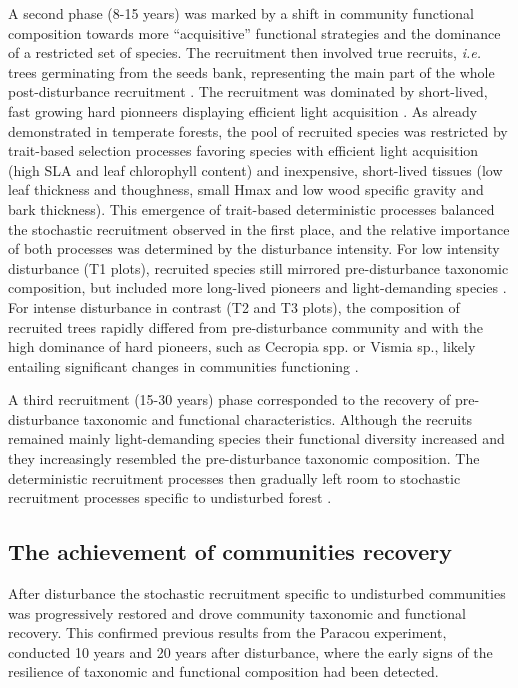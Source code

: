 \documentclass[fleqn,10pt]{ArtEcoFoG} %
\begin{document}
A second phase (8-15 years) was marked by a shift in community
functional composition towards more ``acquisitive'' functional
strategies and the dominance of a restricted set of species. The
recruitment then involved true recruits, \emph{i.e.} trees germinating
from the seeds bank, representing the main part of the whole
post-disturbance recruitment \citep{Lawton1988}. The recruitment was
dominated by short-lived, fast growing hard pionneers displaying efficient light acquisition
\citep{Wright2004, Chave2009b, Herault2011}. As already demonstrated in
temperate forests, the pool of recruited species was restricted by
trait-based selection processes favoring species with efficient light
acquisition (high SLA and leaf chlorophyll content) and inexpensive,
short-lived tissues (low leaf thickness and thoughness, small Hmax and
low wood specific gravity and bark
thickness)\citep{Chave2004, Kunstler2016}. This emergence of trait-based
deterministic processes balanced the stochastic recruitment observed in
the first place, and the relative importance of both processes was
determined by the disturbance intensity. For low intensity disturbance
(T1 plots), recruited species still mirrored pre-disturbance taxonomic
composition, but included more long-lived pioneers and light-demanding
species \citep{Bongers2009}. For intense disturbance in contrast (T2
and T3 plots), the composition of recruited trees rapidly differed from
pre-disturbance community and with the high dominance of hard pioneers,
such as Cecropia spp. or Vismia sp., likely entailing significant changes in
communities functioning \citep{Diaz2005}.

A third recruitment (15-30 years) phase corresponded to the recovery of
pre-disturbance taxonomic and functional characteristics. Although the
recruits remained mainly light-demanding species their functional
diversity increased and they increasingly resembled the
pre-disturbance taxonomic composition. The deterministic recruitment
processes then gradually left room to stochastic recruitment processes
specific to undisturbed forest \citep{Lawton1988, Chave2004}.

\subsection{The achievement of communities
recovery}\label{the-achievement-of-communities-recovery}

After disturbance the stochastic recruitment specific to undisturbed
communities was progressively restored and drove community taxonomic and
functional recovery. This confirmed previous results from the Paracou
experiment, conducted 10 years \citep{Molino2001} and 20 years
\citep{Baraloto2012a} after disturbance, where the early signs of the
resilience of taxonomic and functional composition had been detected.
\end{document}
